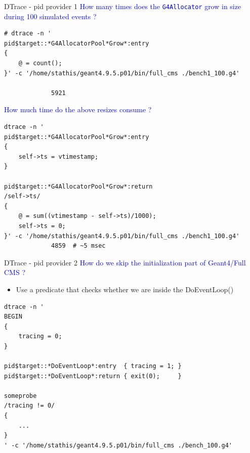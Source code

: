\documentclass{beamer}
\begin{document}
\begin{frame}[fragile]{DTrace - pid provider 1}
\textcolor{blue}{How many times does the {\tt G4Allocator} grow in size during 100 simulated events ?}

\lstset{frame=single, columns=flexible}
\lstset{basicstyle=\tiny\ttfamily}
\begin{lstlisting}
# dtrace -n '
pid$target::*G4AllocatorPool*Grow*:entry
{
    @ = count();
}' -c '/home/stathis/geant4.9.5.p01/bin/full_cms ./bench1_100.g4'

             5921
\end{lstlisting}

\textcolor{blue}{How much time do the above resizes consume ?}

\lstset{frame=single, columns=flexible}
\lstset{basicstyle=\tiny\ttfamily}
\begin{lstlisting}
dtrace -n '
pid$target::*G4AllocatorPool*Grow*:entry
{
    self->ts = vtimestamp;
}

pid$target::*G4AllocatorPool*Grow*:return
/self->ts/
{
    @ = sum((vtimestamp - self->ts)/1000);
    self->ts = 0;
}' -c '/home/stathis/geant4.9.5.p01/bin/full_cms ./bench1_100.g4'
             4859  # ~5 msec
\end{lstlisting}
\end{frame}

\begin{frame}[fragile]{DTrace - pid provider 2}
\textcolor{blue}{How do we skip the initialization part of Geant4/Full CMS ?}
\begin{itemize}
\item Use a predicate that checks whether we are inside the DoEventLoop()
\end{itemize}

\lstset{frame=single, columns=flexible}
\lstset{basicstyle=\tiny\ttfamily}
\begin{lstlisting}
dtrace -n '
BEGIN
{
    tracing = 0;
}

pid$target::*DoEventLoop*:entry  { tracing = 1; }
pid$target::*DoEventLoop*:return { exit(0);     }

someprobe
/tracing != 0/
{
    ...
}
' -c '/home/stathis/geant4.9.5.p01/bin/full_cms ./bench_100.g4'
\end{lstlisting}

\end{frame}
\end{document}
